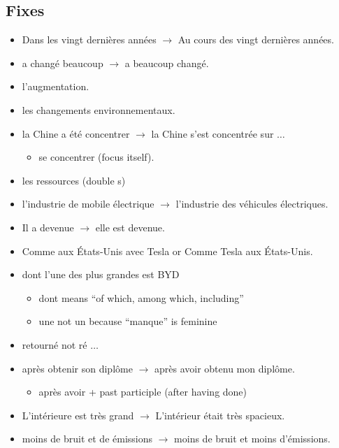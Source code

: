 \documentclass{book}
\begin{document}
        \subsection*{Fixes}
            \begin{itemize}
                \item Dans les vingt dernières années $\to$ Au cours des vingt dernières années.
                \item a changé beaucoup $\to$ a beaucoup changé. 
                \item l'augmentation.
                \item les changements environnementaux.
                \item la Chine a été concentrer $\to$ la Chine s'est concentrée sur $\ldots$
                \begin{itemize}
                    \item se concentrer (focus itself).
                \end{itemize}
                \item les ressources (double s)
                \item l'industrie de mobile électrique $\to$ l'industrie des véhicules électriques.
                \item Il a devenue $\to$ elle est devenue.
                \item Comme aux États-Unis avec Tesla or Comme Tesla aux États-Unis.
                \item dont l'une des plus grandes est BYD
                \begin{itemize}
                    \item dont means ``of which, among which, including''
                    \item une not un because ``manque'' is feminine
                \end{itemize}
                \item retourné not ré $\dots$
                \item après obtenir son diplôme $\to$ après avoir obtenu mon diplôme.
                \begin{itemize}
                    \item après avoir + past participle (after having done)
                \end{itemize}
                \item L'intérieure est très grand $\to$ L'intérieur était très spacieux.
                \item moins de bruit et de émissions $\to$ moins de bruit et moins d'émissions.

\end{itemize}
\end{document}
